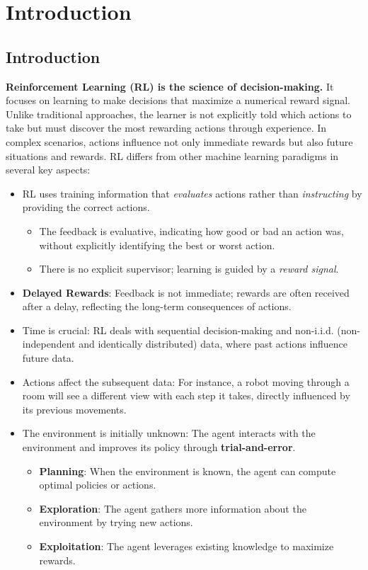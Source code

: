 \chapter{Introduction}
\section{Introduction}

\textbf{Reinforcement Learning (RL) is the science of decision-making.} It focuses on learning to make decisions that maximize a numerical reward signal. Unlike traditional approaches, the learner is not explicitly told which actions to take but must discover the most rewarding actions through experience. In complex scenarios, actions influence not only immediate rewards but also future situations and rewards. RL differs from other machine learning paradigms in several key aspects:
\begin{itemize}
    \item RL uses training information that \textit{evaluates} actions rather than \textit{instructing} by providing the correct actions.
    \begin{itemize}
        \item The feedback is evaluative, indicating how good or bad an action was, without explicitly identifying the best or worst action.
        \item There is no explicit supervisor; learning is guided by a \textit{reward signal}.
    \end{itemize}
    \item \textbf{Delayed Rewards}: Feedback is not immediate; rewards are often received after a delay, reflecting the long-term consequences of actions.
    \item Time is crucial: RL deals with sequential decision-making and non-i.i.d. (non-independent and identically distributed) data, where past actions influence future data.
    \item Actions affect the subsequent data: For instance, a robot moving through a room will see a different view with each step it takes, directly influenced by its previous movements.
    \item The environment is initially unknown: The agent interacts with the environment and improves its policy through \textbf{trial-and-error}.
    \begin{itemize}
        \item \textbf{Planning}: When the environment is known, the agent can compute optimal policies or actions.
        \item \textbf{Exploration}: The agent gathers more information about the environment by trying new actions.
        \item \textbf{Exploitation}: The agent leverages existing knowledge to maximize rewards.
    \end{itemize}
\end{itemize}



